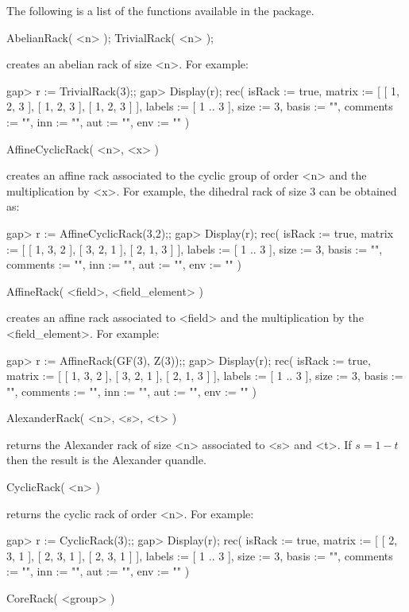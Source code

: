 
The following is a list of the functions available in the {\RiG} package. 

\>AbelianRack( <n> );
\>TrivialRack( <n> );

creates an abelian rack of size <n>. For example:

\beginexample
gap> r := TrivialRack(3);;
gap> Display(r);
rec(
  isRack := true,
  matrix := [ [ 1, 2, 3 ], [ 1, 2, 3 ], [ 1, 2, 3 ] ],
  labels := [ 1 .. 3 ],
  size := 3,
  basis := "",
  comments := "",
  inn := "",
  aut := "",
  env := "" )
\endexample

\>AffineCyclicRack( <n>, <x> )

creates an affine rack associated to the cyclic group of order <n> and
the multiplication by <x>. For example, the dihedral rack of size 3
can be obtained as:

\beginexample
gap> r := AffineCyclicRack(3,2);;
gap> Display(r);
rec(
  isRack := true,
  matrix := [ [ 1, 3, 2 ], [ 3, 2, 1 ], [ 2, 1, 3 ] ],
  labels := [ 1 .. 3 ],
  size := 3,
  basis := "",
  comments := "",
  inn := "",
  aut := "",
  env := "" )
\endexample

\>AffineRack( <field>, <field_element> )

creates an affine rack associated to <field> and the multiplication
by the <field_element>. For example:

\beginexample
gap> r := AffineRack(GF(3), Z(3));;
gap> Display(r);
rec(
  isRack := true,
  matrix := [ [ 1, 3, 2 ], [ 3, 2, 1 ], [ 2, 1, 3 ] ],
  labels := [ 1 .. 3 ],
  size := 3,
  basis := "",
  comments := "",
  inn := "",
  aut := "",
  env := "" )
\endexample

\>AlexanderRack( <n>, <s>, <t> )

returns the Alexander rack of size <n> associated to <s> and <t>.
If $s=1-t$ then the result is the Alexander quandle.

\>CyclicRack( <n> )

returns the cyclic rack of order <n>. For example:

\beginexample
gap> r := CyclicRack(3);;
gap> Display(r);
rec(
  isRack := true,
  matrix := [ [ 2, 3, 1 ], [ 2, 3, 1 ], [ 2, 3, 1 ] ],
  labels := [ 1 .. 3 ],
  size := 3,
  basis := "",
  comments := "",
  inn := "",
  aut := "",
  env := "" )
\endexample

\>CoreRack( <group> )

